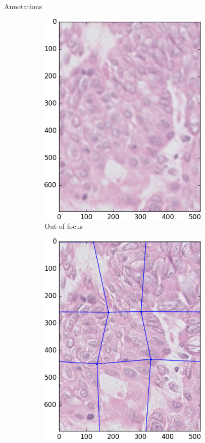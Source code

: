 \documentclass{beamer}
\begin{document}
\begin{frame}{Annotations}
\begin{figure}
\begin{multicols}{6}
\begin{subfigure}{0.2\textwidth}
    \includegraphics[width=0.9\textwidth]{blur.png}\par 
    \caption{Out of focus}
    \label{fig:blur}
	\end{subfigure}%
	\begin{subfigure}{0.2\textwidth}
    \includegraphics[width=0.9\textwidth]{ELAST.png}\par 

\end{subfigure}
\end{multicols}
\end{figure}
\end{frame}
\end{document}
